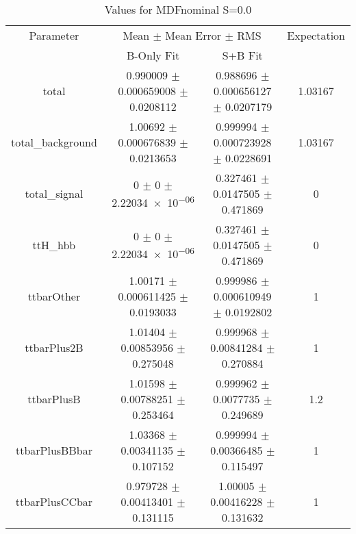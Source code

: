 \begin{table}
\centering
\caption{Values for MDFnominal S=0.0}
\begin{tabular}{cccc}
\toprule
Parameter & \multicolumn{2}{c}{Mean $\pm$ Mean Error $\pm$ RMS} & Expectation\\
 & B-Only Fit & S+B Fit & \\
\midrule
total & \num{0.990009} $\pm$ \num{0.000659008} $\pm$ \num{0.0208112} & \num{0.988696} $\pm$ \num{0.000656127} $\pm$ \num{0.0207179} & \num{1.03167}\\
total\_background & \num{1.00692} $\pm$ \num{0.000676839} $\pm$ \num{0.0213653} & \num{0.999994} $\pm$ \num{0.000723928} $\pm$ \num{0.0228691} & \num{1.03167}\\
total\_signal & \num{0} $\pm$ \num{0} $\pm$ \num{2.22034e-06} & \num{0.327461} $\pm$ \num{0.0147505} $\pm$ \num{0.471869} & \num{0}\\
ttH\_hbb & \num{0} $\pm$ \num{0} $\pm$ \num{2.22034e-06} & \num{0.327461} $\pm$ \num{0.0147505} $\pm$ \num{0.471869} & \num{0}\\
ttbarOther & \num{1.00171} $\pm$ \num{0.000611425} $\pm$ \num{0.0193033} & \num{0.999986} $\pm$ \num{0.000610949} $\pm$ \num{0.0192802} & \num{1}\\
ttbarPlus2B & \num{1.01404} $\pm$ \num{0.00853956} $\pm$ \num{0.275048} & \num{0.999968} $\pm$ \num{0.00841284} $\pm$ \num{0.270884} & \num{1}\\
ttbarPlusB & \num{1.01598} $\pm$ \num{0.00788251} $\pm$ \num{0.253464} & \num{0.999962} $\pm$ \num{0.0077735} $\pm$ \num{0.249689} & \num{1.2}\\
ttbarPlusBBbar & \num{1.03368} $\pm$ \num{0.00341135} $\pm$ \num{0.107152} & \num{0.999994} $\pm$ \num{0.00366485} $\pm$ \num{0.115497} & \num{1}\\
ttbarPlusCCbar & \num{0.979728} $\pm$ \num{0.00413401} $\pm$ \num{0.131115} & \num{1.00005} $\pm$ \num{0.00416228} $\pm$ \num{0.131632} & \num{1}\\
\bottomrule
\end{tabular}
\end{table}